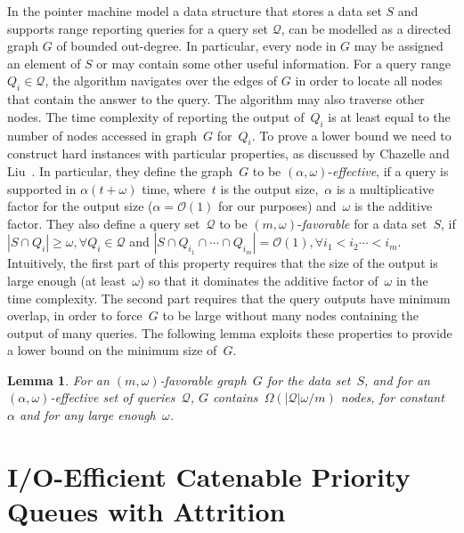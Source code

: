 \documentclass[]{article}
\newcommand{\bigO}{\mathcal{O}}
\newtheorem{lemma}{Lemma}[section]
\begin{document}
In the pointer machine model a data structure that stores a data set $S$ and
supports range reporting queries for a query set $\mathcal{Q}$, can be modelled
as a directed graph $G$ of bounded out-degree. In particular, every node in $G$
may be assigned an element of $S$ or may contain some other useful information.
For a query range $Q_i\in \mathcal{Q}$, the algorithm navigates over the edges
of $G$ in order to locate all nodes that contain the answer to the query. The
algorithm may also traverse other nodes. The time complexity of reporting the
output of~$Q_i$ is at least equal to the number of nodes accessed in graph~$G$
for~$Q_i$. To prove a lower bound we need to construct hard instances with
particular properties, as discussed by Chazelle and Liu~\cite{C90,CL04}. In
particular, they define the graph~$G$ to be
$(\alpha,\omega)$-\textit{effective}, if a query is supported in $\alpha(t +
\omega)$ time, where~$t$ is the output size,~$\alpha$ is a multiplicative factor
for the output size ($\alpha = \bigO(1)$ for our purposes) and~$\omega$ is the
additive factor. They also define a query set~$\mathcal{Q}$ to be
$(m,\omega)$-\textit{favorable} for a data set~$S$, if $|S \cap Q_i| \geq
\omega, \forall Q_i \in \mathcal{Q}$ and $|S \cap Q_{i_1}\cap \cdots \cap
Q_{i_m}| = \bigO(1), \forall i_1 <i_2 \cdots< i_m$. Intuitively, the first part
of this property requires that the size of the output is large enough (at
least~$\omega$) so that it dominates the additive factor of~$\omega$ in the time
complexity. The second part requires that the query outputs have minimum
overlap, in order to force~$G$ to be large without many nodes containing the
output of many queries. The following lemma exploits these properties to provide
a lower bound on the minimum size of~$G$.

\begin{lemma} \label{lem:lower} \cite[Lemma 2.3]{CL04} For an
  $(m,\omega)$-favorable graph~$G$ for the data set~$S$, and for an
  $(\alpha,\omega)$-effective set of queries~$\mathcal{Q}$, $G$
  contains~$\Omega(|\mathcal{Q}|\omega/m)$ nodes, for
  constant~$\alpha$ and for any large enough~$\omega$.
\end{lemma}

\section{I/O-Efficient Catenable Priority Queues with Attrition} \label{sec:iocpqa}
\end{document}
